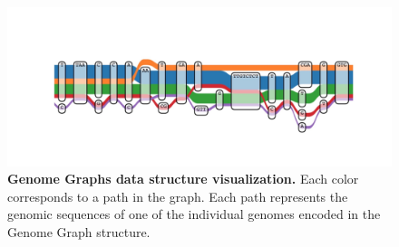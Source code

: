 \documentclass[a4paper, titlepage, openright]{book}
\begin{document}
\begin{figure}
	\centering
	\includegraphics[width=\textwidth]{figures/vg.jpg}
	\caption[Genome Graphs data structure visualization]{\textbf{Genome Graphs data structure visualization.}  Each color corresponds to a path in the graph. Each path represents the genomic sequences of one of the individual genomes encoded in the Genome Graph structure.}
	\label{fig:vg}
\end{figure} 
\end{document}
